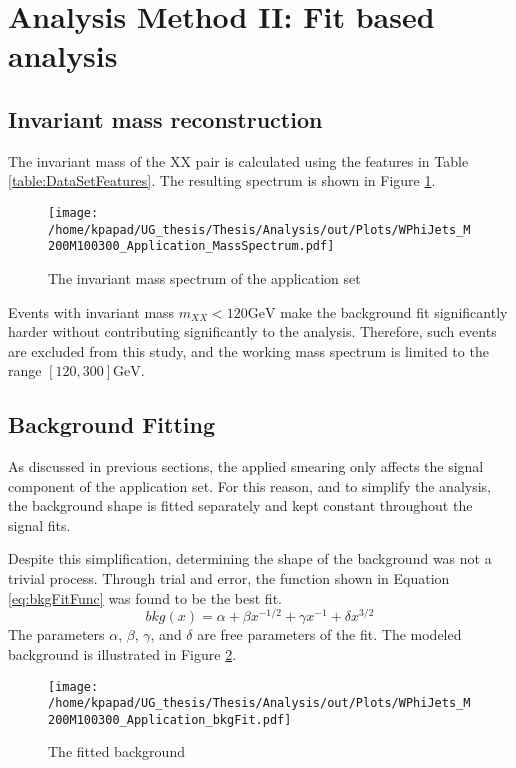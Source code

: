 \section{Analysis Method II: Fit based analysis}
\label{sec:orgb3ebefa}
\label{sec:Analysis_method2}
\subsection{Invariant mass reconstruction}
\label{sec:org2532a44}
\label{sec:Invariant_mass_reconstruction}
The invariant mass of the XX pair is calculated using the features in Table \ref{table:DataSetFeatures}. The resulting spectrum is shown in Figure \ref{fig:AppMass}.

\begin{figure}[h!]
\centering
\texttt{[image: /home/kpapad/UG\_thesis/Thesis/Analysis/out/Plots/WPhiJets\_M200M100300\_Application\_MassSpectrum.pdf]}
\caption{The invariant mass spectrum of the application set}
\label{fig:AppMass}
\end{figure}

Events with invariant mass \(m_{XX} < 120\text{GeV}\) make the background fit significantly harder without contributing significantly to the analysis. Therefore, such events are excluded from this study, and the working mass spectrum is limited to the range \([120, 300]\text{GeV}\).
\subsection{Background Fitting}
\label{sec:org780d746}
\label{sec:Background_fitting}
As discussed in previous sections, the applied smearing only affects the signal component of the application set. For this reason, and to simplify the analysis, the background shape is fitted separately and kept constant throughout the signal fits.

Despite this simplification, determining the shape of the background was not a trivial process. Through trial and error, the function shown in Equation \ref{eq:bkgFitFunc} was found to be the best fit.
\begin{equation}
bkg(x) = \alpha + \beta x^{-1/2} + \gamma x^{-1} + \delta x^{3/2}
\label{eq:bkgFitFunc}
\end{equation}
The parameters \(\alpha\), \(\beta\), \(\gamma\), and \(\delta\) are free parameters of the fit. The modeled background is illustrated in Figure \ref{fig:BKGfit}.

\begin{figure}[h!]
\centering
\texttt{[image: /home/kpapad/UG\_thesis/Thesis/Analysis/out/Plots/WPhiJets\_M200M100300\_Application\_bkgFit.pdf]}
\caption{The fitted background}
\label{fig:BKGfit}
\end{figure}
